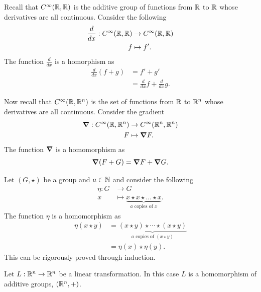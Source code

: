 \documentclass{ximera}
\begin{document}
\begin{example}[Derivatives]\label{EG:der}
  Recall that $C^\infty(\mathbb R,\mathbb R)$ is the additive group of functions
  from $\mathbb R$ to $\mathbb R$ whose derivatives are all continuous. Consider the
  following
  \begin{align*}
    \frac{d}{dx}:C^\infty(\mathbb R,\mathbb R) &\to C^\infty(\mathbb R,\mathbb R) \\
      f &\mapsto f'.
  \end{align*}
  The function $\frac{d}{dx}$ is a homorphism as
  \begin{align*}
    \frac{d}{dx}(f+ g) &= f' + g' \\
    &= \frac{d}{dx}f + \frac{d}{dx}g.
  \end{align*}
\end{example}


\begin{example}\label{EG:grad}
  Now recall that $C^\infty(\mathbb R,\mathbb R^n)$ is the set of functions from
  $\mathbb R$ to $\mathbb R^n$ whose derivatives are all continuous. Consider the
  gradient
  \begin{align*}
    \boldsymbol\nabla:C^\infty(\mathbb R,\mathbb R^n) &\to C^\infty(\mathbb R^n,\mathbb R^n)\\
    F &\mapsto \boldsymbol\nabla F.
  \end{align*}
  The function $\boldsymbol\nabla$ is a homomorphism as
  \begin{align*}
    \boldsymbol\nabla(F + G) = \boldsymbol\nabla F + \boldsymbol\nabla G.
  \end{align*}
\end{example}


\begin{example}\label{EG:he}
  Let $(G,\star)$ be a group and $a\in\mathbb N$ and consider the following
  \begin{align*}
    \eta: G &\to G\\
    x &\mapsto \underbrace{x\star x\star \dots\star x}_{\text{$a$ copies of $x$}}.
  \end{align*}
  The function $\eta$ is a homomorphism as
  \begin{align*}
    \eta(x \star  y) &= \underbrace{(x\star  y) \star \cdots \star (x\star  y)}_{\text{$a$ copies of $(x\star y)$}} \\
    &= \eta(x) \star  \eta(y).
  \end{align*}
  This can be rigorously proved through induction.
\end{example}



\begin{example}
  Let $L:\mathbb R^n\to \mathbb R^n$ be a linear transformation. In this case $L$ is
  a homomorphism of additive groups, $(\mathbb R^n,+)$.
\end{example}
\end{document}
